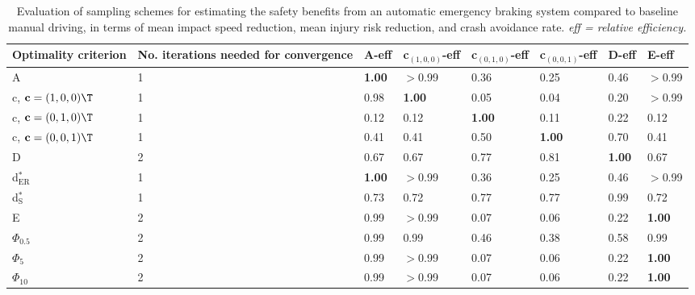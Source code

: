 \begin{table}[htb!]
\centering
\caption{Evaluation of sampling schemes for estimating the safety benefits from an automatic emergency braking system compared to baseline manual driving, in terms of mean impact speed reduction, mean injury risk reduction, and crash avoidance rate. \textit{eff = relative efficiency.}} 
\label{tab:finite_population_inference}
\begin{tabular}{p{2.75cm}R{3.125cm}R{0.9cm}R{1.5cm}R{1.5cm}R{1.5cm}R{0.9cm}R{0.9cm}}
 Optimality criterion & No. iterations needed for convergence & A-eff & c$_{(1,0,0)}$-eff & c$_{(0,1,0)}$-eff & c$_{(0,0,1)}$-eff & D-eff & E-eff \\ 
  \hline
A & 1 & \textbf{1.00} & $>$0.99 & 0.36 & 0.25 & 0.46 & $>$0.99 \\ 
  c, $\mathbf{c} = (1,0,0)\T$ & 1 & 0.98 & \textbf{1.00} & 0.05 & 0.04 & 0.20 & $>$0.99 \\ 
  c, $\mathbf{c} = (0,1,0)\T$ & 1 & 0.12 & 0.12 & \textbf{1.00} & 0.11 & 0.22 & 0.12 \\ 
  c, $\mathbf{c} = (0,0,1)\T$ & 1 & 0.41 & 0.41 & 0.50 & \textbf{1.00} & 0.70 & 0.41 \\ 
  D & 2 & 0.67 & 0.67 & 0.77 & 0.81 & \textbf{1.00} & 0.67 \\ 
  d$^*_{\mathrm{ER}}$ & 1 & \textbf{1.00} & $>$0.99 & 0.36 & 0.25 & 0.46 & $>$0.99 \\ 
  d$^*_{\mathrm{S}}$ & 1 & 0.73 & 0.72 & 0.77 & 0.77 & 0.99 & 0.72 \\ 
  E & 2 & 0.99 & $>$0.99 & 0.07 & 0.06 & 0.22 & \textbf{1.00} \\ 
  $\Phi_{0.5}$ & 2 & 0.99 & 0.99 & 0.46 & 0.38 & 0.58 & 0.99 \\ 
  $\Phi_5$ & 2 & 0.99 & $>$0.99 & 0.07 & 0.06 & 0.22 & \textbf{1.00} \\ 
  $\Phi_{10}$ & 2 & 0.99 & $>$0.99 & 0.07 & 0.06 & 0.22 & \textbf{1.00} \\ 
   \hline
\end{tabular}
\end{table}
